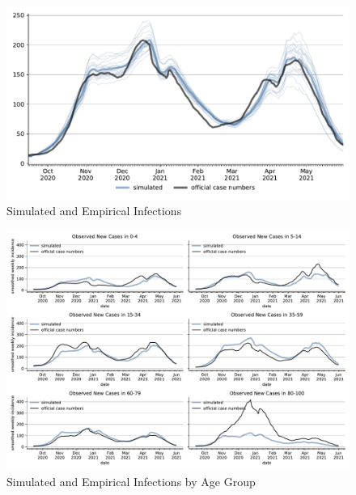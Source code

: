\begin{figure}[ht]
\centering
  \includegraphics[width=\textwidth]{../figures/results/figures/scenario_comparisons/combined_fit/full_new_known_case_with_single_runs}
\caption{Simulated and Empirical Infections}
\label{fig:aggregated_fit2}
\end{figure}



\begin{figure}[ht]
\centering
  \includegraphics[width=\textwidth]{../figures/results/figures/incidences_by_group/age_group_rki/full_combined_baseline_new_known_case}
\caption{Simulated and Empirical Infections by Age Group}
\label{fig:age_group_fit}
\end{figure}


